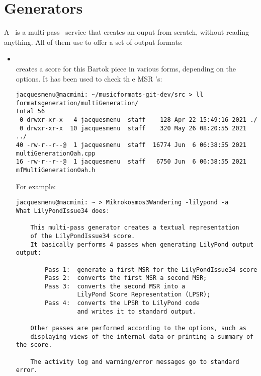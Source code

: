 \section{Generators}

A \generator\ is a multi-pass \CLI\ service that creates an ouput from scratch, without reading anything. All of them use  to offer a set of output formats:
\begin{itemize}
\item {}\\
			creates a score for this Bartok piece in various forms, depending on the options. It has been used to check th e MSR \API's:

\begin{lstlisting}[language=Terminal]
jacquesmenu@macmini: ~/musicformats-git-dev/src > ll formatsgeneration/multiGeneration/
total 56
 0 drwxr-xr-x   4 jacquesmenu  staff    128 Apr 22 15:49:16 2021 ./
 0 drwxr-xr-x  10 jacquesmenu  staff    320 May 26 08:20:55 2021 ../
40 -rw-r--r--@  1 jacquesmenu  staff  16774 Jun  6 06:38:55 2021 multiGenerationOah.cpp
16 -rw-r--r--@  1 jacquesmenu  staff   6750 Jun  6 06:38:55 2021 mfMultiGenerationOah.h
\end{lstlisting}

For example:
\begin{lstlisting}[language=Terminal]
jacquesmenu@macmini: ~ > Mikrokosmos3Wandering -lilypond -a
What LilyPondIssue34 does:

    This multi-pass generator creates a textual representation
    of the LilyPondIssue34 score.
    It basically performs 4 passes when generating LilyPond output output:

        Pass 1:  generate a first MSR for the LilyPondIssue34 score
        Pass 2:  converts the first MSR a second MSR;
        Pass 3:  converts the second MSR into a
                 LilyPond Score Representation (LPSR);
        Pass 4:  converts the LPSR to LilyPond code
                 and writes it to standard output.

    Other passes are performed according to the options, such as
    displaying views of the internal data or printing a summary of the score.

    The activity log and warning/error messages go to standard error.
\end{lstlisting}


\end{itemize}
